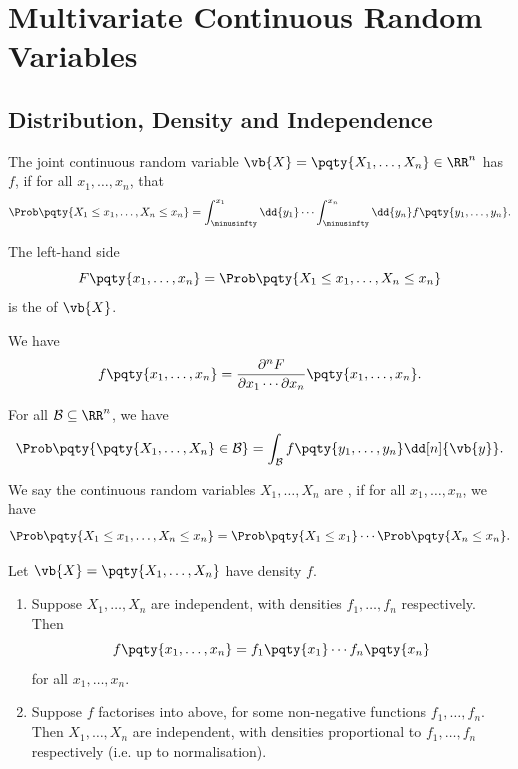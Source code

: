 \section{Multivariate Continuous Random Variables}

\subsection{Distribution, Density and Independence}

\begin{definition}
    \label{def:distribution-density-joint-crv}%
    The joint continuous random variable \(\vb{X} = \pqty{X_1, \ldots, X_n} \in \RR^n\) has  \(f\), if for all \(x_1, \ldots, x_n\), that
    \[
        \Prob\pqty{X_1 \leq x_1, \ldots, X_n \leq x_n} = \int_{\minusinfty}^{x_1} \dd{y_1} \cdots \int_{\minusinfty}^{x_n} \dd{y_n} f\pqty{y_1, \ldots, y_n}.
    \]

    The left-hand side
    \[
        F \pqty{x_1, \ldots, x_n} = \Prob\pqty{X_1 \leq x_1, \ldots, X_n \leq x_n}
    \]
    is the  of \(\vb{X}\).
\end{definition}

We have
\[
    f\pqty{x_1, \ldots, x_n} = \frac{\partial^n F}{\partial x_1 \cdots \partial x_n} \pqty{x_1, \ldots, x_n}.
\]

For all \(\mathcal{B} \subseteq \RR^n\), we have
\[
    \Prob\pqty{\pqty{X_1, \ldots, X_n} \in \mathcal{B}} = \int_{\mathcal{B}} f \pqty{y_1, \ldots, y_n} \dd[n]{\vb{y}}.
\]

\begin{definition}
    \label{def:independence-continuous-random-variables}%
    We say the continuous random variables \(X_1, \ldots, X_n\) are , if for all \(x_1, \ldots, x_n\), we have
    \[
        \Prob\pqty{X_1 \leq x_1, \ldots, X_n \leq x_n} = \Prob\pqty{X_1 \leq x_1} \cdots \Prob\pqty{X_n \leq x_n}.
    \]
\end{definition}

\begin{theorem}
    \label{thm:rv-independent-density-separable}%
    Let \(\vb{X} = \pqty{X_1, \ldots, X_n}\) have density \(f\).
    \begin{enumerate}
        \item Suppose \(X_1, \ldots, X_n\) are independent, with densities \(f_1, \ldots, f_n\) respectively. Then
        \[
            f\pqty{x_1, \ldots, x_n} = f_1\pqty{x_1} \cdots f_n\pqty{x_n}
        \]
        for all \(x_1, \ldots, x_n\).
        \item Suppose \(f\) factorises into above, for some non-negative functions \(f_1, \ldots, f_n\). Then \(X_1, \ldots, X_n\) are independent, with densities proportional to \(f_1, \ldots, f_n\) respectively (i.e. up to normalisation).
    \end{enumerate}
\end{theorem}

